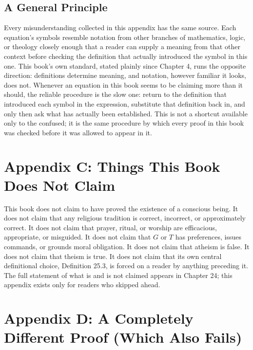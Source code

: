 \documentclass[11pt]{book}
\begin{document}
\section*{A General Principle}

Every misunderstanding collected in this appendix has the same source. Each equation's symbols resemble notation from other branches of mathematics, logic, or theology closely enough that a reader can supply a meaning from that other context before checking the definition that actually introduced the symbol in this one. This book's own standard, stated plainly since Chapter 4, runs the opposite direction: definitions determine meaning, and notation, however familiar it looks, does not. Whenever an equation in this book seems to be claiming more than it should, the reliable procedure is the slow one: return to the definition that introduced each symbol in the expression, substitute that definition back in, and only then ask what has actually been established. This is not a shortcut available only to the confused; it is the same procedure by which every proof in this book was checked before it was allowed to appear in it.

\chapter*{Appendix C: Things This Book Does Not Claim}

This book does not claim to have proved the existence of a conscious being. It does not claim that any religious tradition is correct, incorrect, or approximately correct. It does not claim that prayer, ritual, or worship are efficacious, appropriate, or misguided. It does not claim that $G$ or $T$ has preferences, issues commands, or grounds moral obligation. It does not claim that atheism is false. It does not claim that theism is true. It does not claim that its own central definitional choice, Definition 25.3, is forced on a reader by anything preceding it. The full statement of what is and is not claimed appears in Chapter 24; this appendix exists only for readers who skipped ahead.

\chapter*{Appendix D: A Completely Different Proof (Which Also Fails)}
\end{document}
